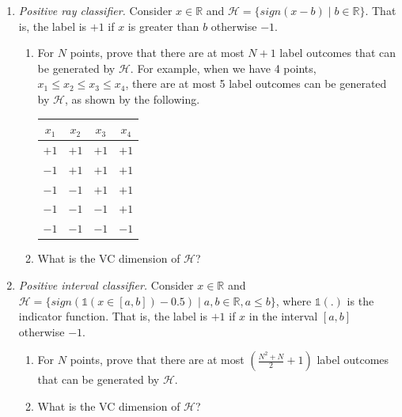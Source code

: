 \documentclass[11pt]{article}
\begin{document}
\begin{enumerate}
    \item {\emph{Positive ray classifier.} 
    Consider $x \in \mathbb{R}$ and $\mathcal{H} = \{ sign(x - b) \mid b \in \mathbb{R} \}$. That is, the label is $+1$ if $x$ is greater than $b$ otherwise $-1$. 
    \begin{enumerate}
        \item { For $N$ points, prove that there are at most $N+1$ label outcomes that can be generated by $\mathcal{H}$. For example, when we have 4 points, $x_1 \leq x_2 \leq x_3 \leq x_4$, there are at most 5 label outcomes can be generated by $\mathcal{H}$, as shown by the following.
        
        \begin{tabular}{cccc}
             $x_1$ & $x_2$ & $x_3$ & $x_4$ \\
             \hline
             $+1$ & $+1$ & $+1$ & $+1$ \\
             $-1$ & $+1$ & $+1$ & $+1$ \\
             $-1$ & $-1$ & $+1$ & $+1$ \\
             $-1$ & $-1$ & $-1$ & $+1$ \\
             $-1$ & $-1$ & $-1$ & $-1$ \\
        \end{tabular}
        
        \solution{}
        }
        \item { What is the VC dimension of $\mathcal{H}$?
        
        \solution{}
        }
    \end{enumerate}
    }
    \item {\emph{Positive interval classifier.} 
    Consider $x \in \mathbb{R}$ and $\mathcal{H} = \{ sign( \mathds{1}(x \in [a, b])-0.5)  \mid a,b \in \mathbb{R}, a\leq b \}$, where $\mathds{1}(.)$ is the indicator function. That is, the label is $+1$ if $x$ in the interval $[a,b]$ otherwise $-1$. 
    \begin{enumerate}
        \item { For $N$ points, prove that there are at most $(\frac{N^2 + N}{2}+1)$ label outcomes that can be generated by $\mathcal{H}$.
        
        \solution{}
        }
        \item { What is the VC dimension of $\mathcal{H}$?
        
        \solution{}
        }
    \end{enumerate}
    }
\end{enumerate}
\end{document}
